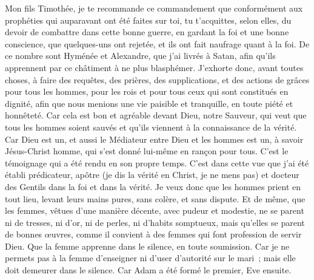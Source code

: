 \begin{multicols}{2}
Mon fils Timothée, je te recommande ce commandement que conformément aux prophéties qui auparavant ont été faites sur toi, tu t'acquittes, selon elles, du devoir de combattre dans cette bonne guerre,
en gardant la foi et une bonne conscience, que quelques-uns ont rejetée, et ils ont fait naufrage quant à la foi.
De ce nombre sont Hyménée et Alexandre, que j'ai livrés à Satan, afin qu'ils apprennent par ce châtiment à ne plus blasphémer.
\VerseOne{}J'exhorte donc, avant toutes choses, à faire des requêtes, des prières, des supplications, et des actions de grâces pour tous les hommes,
pour les rois et pour tous ceux qui sont constitués en dignité, afin que nous menions une vie paisible et tranquille, en toute piété et honnêteté.
Car cela est bon et agréable devant Dieu, notre Sauveur,
qui veut que tous les hommes soient sauvés et qu'ils viennent à la connaissance de la vérité.
Car Dieu est un, et aussi le Médiateur entre Dieu et les hommes est un, à savoir Jésus-Christ homme,
qui s'est donné lui-même en rançon pour tous. C'est le témoignage qui a été rendu en son propre temps.
C'est dans cette vue que j'ai été établi prédicateur, apôtre (je dis la vérité en Christ, je ne mens pas) et docteur des Gentils dans la foi et dans la vérité.
Je veux donc que les hommes prient en tout lieu, levant leurs mains pures, sans colère, et sans dispute.
Et de même, que les femmes, vêtues d'une manière décente, avec pudeur et modestie, ne se parent ni de tresses, ni d'or, ni de perles, ni d'habits somptueux,
mais qu'elles se parent de bonnes œuvres, comme il convient à des femmes qui font profession de servir Dieu.
Que la femme apprenne dans le silence, en toute soumission.
Car je ne permets pas à la femme d'enseigner ni d'user d'autorité sur le mari~; mais elle doit demeurer dans le silence.
Car Adam a été formé le premier, Eve ensuite.

\end{multicols}
